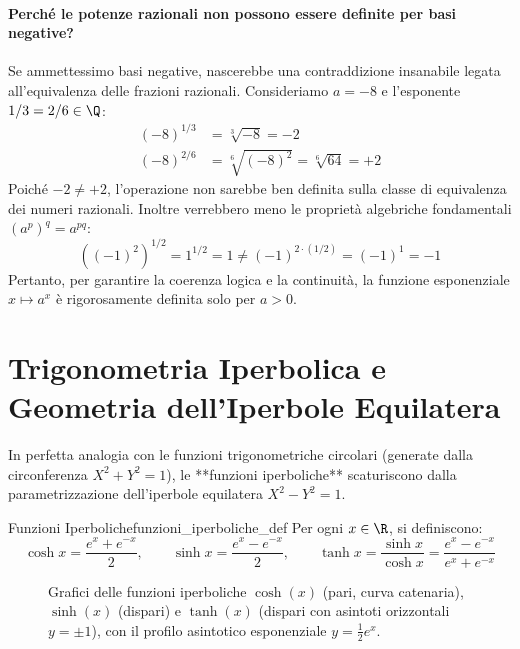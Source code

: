 \paragraph{Perché le potenze razionali non possono essere definite per basi negative?}
Se ammettessimo basi negative, nascerebbe una contraddizione insanabile legata all'equivalenza delle frazioni razionali.
Consideriamo $a = -8$ e l'esponente $1/3 = 2/6 \in \Q$:
\begin{align*}
    (-8)^{1/3} &= \sqrt[3]{-8} = -2 \\
    (-8)^{2/6} &= \sqrt[6]{(-8)^2} = \sqrt[6]{64} = +2
\end{align*}
Poiché $-2 \neq +2$, l'operazione non sarebbe ben definita sulla classe di equivalenza dei numeri razionali. Inoltre verrebbero meno le proprietà algebriche fondamentali $(a^p)^q = a^{pq}$:
\[
    \left((-1)^2\right)^{1/2} = 1^{1/2} = 1 \neq (-1)^{2 \cdot (1/2)} = (-1)^1 = -1
\]
Pertanto, per garantire la coerenza logica e la continuità, la funzione esponenziale $x \mapsto a^x$ è rigorosamente definita solo per $a > 0$.

\section{Trigonometria Iperbolica e Geometria dell'Iperbole Equilatera}
\label{sec:trigonometria_iperbolica_completa}

In perfetta analogia con le funzioni trigonometriche circolari (generate dalla circonferenza $X^2 + Y^2 = 1$), le **funzioni iperboliche** scaturiscono dalla parametrizzazione dell'iperbole equilatera $X^2 - Y^2 = 1$.

\begin{definizione}{Funzioni Iperboliche}{funzioni_iperboliche_def}
Per ogni $x \in \R$, si definiscono:
\[
    \cosh x = \frac{e^x + e^{-x}}{2}, \qquad \sinh x = \frac{e^x - e^{-x}}{2}, \qquad \tanh x = \frac{\sinh x}{\cosh x} = \frac{e^x - e^{-x}}{e^x + e^{-x}}
\]
\end{definizione}

\begin{figure}[htbp]
    \centering
    
    \caption{Grafici delle funzioni iperboliche $\cosh(x)$ (pari, curva catenaria), $\sinh(x)$ (dispari) e $\tanh(x)$ (dispari con asintoti orizzontali $y = \pm 1$), con il profilo asintotico esponenziale $y = \frac{1}{2}e^x$.}
    \label{fig:funzioni_iperboliche_plot}
\end{figure}

